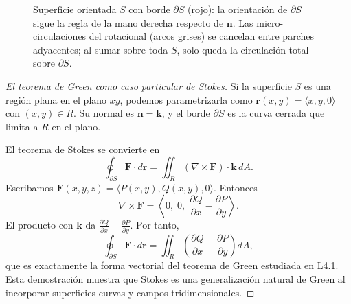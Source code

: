 \begin{figure}[!htbp]
\centering
{}
\caption{Superficie orientada $S$ con borde $\partial S$ (rojo): la orientación de $\partial S$ sigue la regla de la mano derecha respecto de $\mathbf{n}$. Las micro-circulaciones del rotacional (arcos grises) se cancelan entre parches adyacentes; al sumar sobre toda $S$, solo queda la circulación total sobre $\partial S$.}
\label{fig:stokes_superficie}
\end{figure}

\begin{proof}[El teorema de Green como caso particular de Stokes]
Si la superficie $S$ es una región plana en el plano $xy$, podemos parametrizarla como $\mathbf{r}(x,y)=\langle x,y,0\rangle$ con $(x,y)\in R$. Su normal es $\mathbf{n}=\mathbf{k}$, y el borde $\partial S$ es la curva cerrada que limita a $R$ en el plano. 
\par
El teorema de Stokes se convierte en
\[
\oint_{\partial S} \mathbf{F}\cdot d\mathbf{r}
=
\iint_R (\nabla\times\mathbf{F})\cdot\mathbf{k}\,dA.
\]
Escribamos $\mathbf{F}(x,y,z)=\langle P(x,y), Q(x,y), 0\rangle$. Entonces
\[
\nabla\times\mathbf{F}
=
\left\langle 0,\; 0,\; \frac{\partial Q}{\partial x}-\frac{\partial P}{\partial y} \right\rangle.
\]
El producto con $\mathbf{k}$ da $\frac{\partial Q}{\partial x}-\frac{\partial P}{\partial y}$. Por tanto,
\[
\oint_{\partial S} \mathbf{F}\cdot d\mathbf{r}
=
\iint_R \left( \frac{\partial Q}{\partial x}-\frac{\partial P}{\partial y} \right)dA,
\]
que es exactamente la forma vectorial del teorema de Green estudiada en L4.1. Esta demostración muestra que Stokes es una generalización natural de Green al incorporar superficies curvas y campos tridimensionales.
\end{proof}

